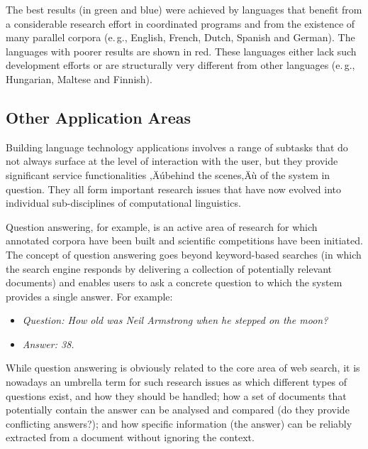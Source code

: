 \begin{multicols}{2}
The best results (in green and blue) were achieved by languages that benefit from a considerable research effort in coordinated programs and from the existence of many parallel corpora (e.\,g., English, French, Dutch, Spanish and German). The languages with poorer results are shown in red. These languages either lack such development efforts or are structurally very different from other languages (e.\,g., Hungarian, Maltese and Finnish).










\subsection{Other Application Areas}

Building language technology applications involves a range of subtasks
that do not always surface at the level of interaction with the user,
but they provide significant service functionalities
‚Äúbehind the scenes‚Äù of the system in
question. They all form important research issues that have now
evolved into individual sub-disciplines of computational linguistics. 

Question answering, for example, is an active area of research for which annotated corpora have been built and scientific competitions have been initiated. The concept of question answering goes beyond keyword-based searches (in which the search engine responds by delivering a collection of potentially relevant documents) and enables users to ask a concrete question to which the system provides a single answer. For example:

\begin{itemize}
\item[] \textit{Question: How old was Neil Armstrong when he stepped on the moon?}
\item[] \textit{Answer: 38.}
\end{itemize}

While question answering is obviously related to the core area of web search, it is nowadays an umbrella term for such research issues as which different types of questions exist, and how they should be handled; how a set of documents that potentially contain the answer can be analysed and compared (do they provide conflicting answers?); and how specific information (the answer) can be reliably extracted from a document without ignoring the context. 



\end{multicols}
